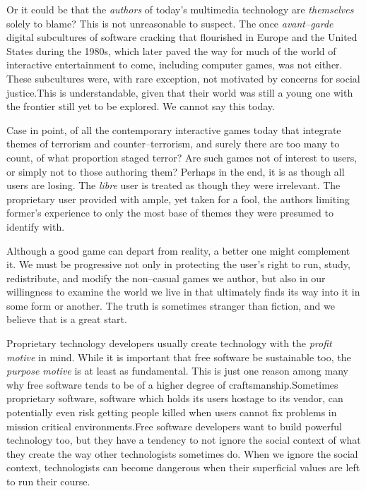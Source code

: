 Or it could be that the {\it authors} of today's multimedia technology are {\it themselves} solely to blame? This is not unreasonable to suspect. The once {\it avant--garde} digital subcultures of software cracking that flourished in Europe and the United States during the 1980s, which later paved the way for much of the world of interactive entertainment to come, including computer games, was not either. These subcultures were, with rare exception, not motivated by concerns for social justice.\footnotecite[extras={, p.~18.}][wasiak2012] This is understandable, given that their world was still a young one with the frontier still yet to be explored. We cannot say this today.

Case in point, of all the contemporary interactive games today that integrate themes of terrorism and counter--terrorism, and surely there are too many to count, of what proportion staged terror? Are such games not of interest to users, or simply not to those authoring them? Perhaps in the end, it is as though all users are losing. The {\it libre} user is treated as though they were irrelevant. The proprietary user provided with ample, yet taken for a fool, the authors limiting former's experience to only the most base of themes they were presumed to identify with.

Although a good game can depart from reality, a better one might complement it. We must be progressive not only in protecting the user's right to run, study, redistribute, and modify the non--casual games we author, but also in our willingness to examine the world we live in that ultimately finds its way into it in some form or another. The truth is sometimes stranger than fiction, and we believe that is a great start.

Proprietary technology developers usually create technology with the {\it profit motive} in mind. While it is important that free software be sustainable too, the {\it purpose motive} is at least as fundamental. This is just one reason among many why free software tends to be of a higher degree of craftsmanship. Sometimes proprietary software, software which holds its users hostage to its vendor, can potentially even risk getting people killed when users cannot fix problems in mission critical environments. Free software developers want to build powerful technology too, but they have a tendency to not ignore the social context of what they create the way other technologists sometimes do. When we ignore the social context, technologists can become dangerous when their superficial values are left to run their course.\footnotecite[black2012]\footnotecite[brew2012]


